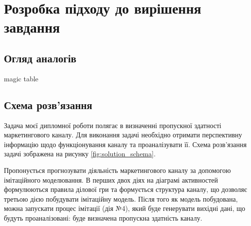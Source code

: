 \section{Розробка підходу до вирішення завдання}

\subsection{Огляд аналогів}
magic table

\subsection{Схема розв’язання}
Задача моєї дипломної роботи полягає в визначенні пропускної здатності маркетингового каналу. Для виконання задачі необхідно отримати перспективну інформацію щодо функціонування каналу та проаналізувати її. Схема розв’язання задачі зображена на рисунку \ref{fig:solution_schema}.

Пропонується прогнозувати діяльність маркетингового каналу за допомогою імітаційного моделювання. В перших двох діях на діаграмі активностей формулюються правила ділової гри та формується структура каналу, що дозволяє третьою дією побудувати імітаційну модель. Після того як модель побудована, можна запускати процес імітації (дія №4), який буде генерувати вихідні дані, що будуть проаналізовані: буде визначена пропускна здатність каналу.



